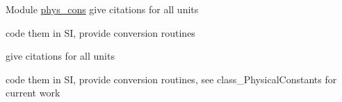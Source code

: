 \label{todo__todo000001}
\hypertarget{todo__todo000001}{}
 
\begin{DoxyDescription}
\item[Module \hyperlink{namespacephys__cons}{phys\_\-cons} ]give citations for all units 

code them in SI, provide conversion routines 

give citations for all units 

code them in SI, provide conversion routines, see class\_\-PhysicalConstants for current work 
\end{DoxyDescription}